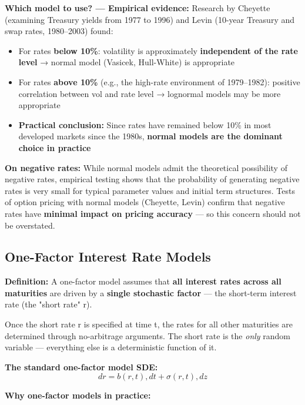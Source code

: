\documentclass[12pt,openany]{book}
\theoremstyle{definition}
\theoremstyle{remark}
\begin{document}
\textbf{Which model to use? --- Empirical evidence:} Research by Cheyette (examining Treasury yields from 1977 to 1996) and Levin (10-year Treasury and swap rates, 1980--2003) found:

\begin{itemize}
\item For rates \textbf{below 10\%}: volatility is approximately \textbf{independent of the rate level} → normal model (Vasicek, Hull-White) is appropriate


\item For rates \textbf{above 10\%} (e.g., the high-rate environment of 1979--1982): positive correlation between vol and rate level → lognormal models may be more appropriate


\item \textbf{Practical conclusion:} Since rates have remained below 10\% in most developed markets since the 1980s, \textbf{normal models are the dominant choice in practice}


\end{itemize}
\textbf{On negative rates:} While normal models admit the theoretical possibility of negative rates, empirical testing shows that the probability of generating negative rates is very small for typical parameter values and initial term structures. Tests of option pricing with normal models (Cheyette, Levin) confirm that negative rates have \textbf{minimal impact on pricing accuracy} --- so this concern should not be overstated.

\medskip
\subsection{One-Factor Interest Rate Models}
\textbf{Definition:} A one-factor model assumes that \textbf{all interest rates across all maturities} are driven by a \textbf{single stochastic factor} --- the short-term interest rate (the "short rate" r).

Once the short rate r is specified at time t, the rates for all other maturities are determined through no-arbitrage arguments. The short rate is the \emph{only} random variable --- everything else is a deterministic function of it.

\textbf{The standard one-factor model SDE:} \[
dr = b(r,t) , dt + \sigma(r,t) , dz
\]

\textbf{Why one-factor models in practice:}
\end{document}
